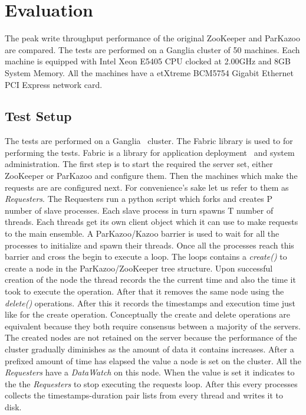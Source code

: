 \chapter{Evaluation}

The peak write throughput performance of the original ZooKeeper and ParKazoo are compared. The tests are performed on a Ganglia cluster of 50 machines. Each machine is equipped with Intel\textsuperscript{\textregistered}  Xeon\textsuperscript{\texttrademark}  E5405 CPU clocked at 2.00GHz and 8GB System Memory. All the machines have a etXtreme BCM5754 Gigabit Ethernet PCI Express network card.

\section{Test Setup}
The tests are performed on a Ganglia~\cite{sacerdoti2003wide} cluster. The Fabric library is used to for performing the tests. Fabric is a library for application deployment~\cite{spotswood2003systems} and system administration. The first step is to start the required the server set, either ZooKeeper or ParKazoo and configure them. Then the machines which make the requests are are configured next. For convenience's sake let us refer to them as \textit{Requesters}. The Requesters run a python script which forks and creates P number of slave processes. Each slave process in turn spawns T number of threads. Each threads get its own client object which it can use to make requests to the main ensemble. A ParKazoo/Kazoo barrier is used to wait for all the processes to initialize and spawn their threads. Once all the processes reach this barrier and cross the begin to execute a loop. The loops contains a \textit{create()} to create a node in the ParKazoo/ZooKeeper tree structure. Upon successful creation of the node the thread records the the current time and also the time it took to execute the operation. After that it removes the same node using the \textit{delete()} operations. After this it records the timestamps and execution time just like for the create operation. Conceptually the create and delete operations are equivalent because they both require consensus between a majority of the servers. The created nodes are not retained on the server because the performance of the cluster gradually diminishes as the amount of data it contains increases. After a prefixed amount of time has elapsed the value a node is set on the cluster. All the \textit{Requesters} have a \textit{DataWatch} on this node. When the value is set it indicates to the the \textit{Requesters} to stop executing the requests loop. After this every processes collects the timestamps-duration pair lists from every thread and writes it to disk. 

